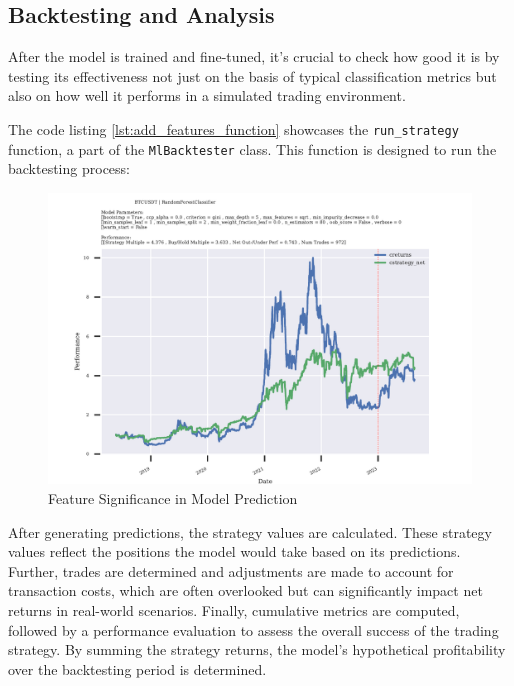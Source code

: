\subsection{Backtesting and Analysis}
After the model is trained and fine-tuned, it's crucial to check how good it is by testing its effectiveness not just on the basis of typical classification metrics but also on how well it performs in a simulated trading environment.

The code listing \ref{lst:add_features_function} showcases the \texttt{run\_strategy} function, a part of the \texttt{MlBacktester} class. This function is designed to run the backtesting process:

\begin{figure}[h]
\centering
\begin{adjustbox}{max width=1.3\textwidth,center}
\includegraphics[scale=1.3]{./pdf/report/backtest_res.pdf}
\end{adjustbox}
\caption{Feature Significance in Model Prediction}
\label{fig:backtest_res}
\end{figure}

After generating predictions, the strategy values are calculated. These strategy values reflect the positions the model would take based on its predictions.
Further, trades are determined and adjustments are made to account for transaction costs, which are often overlooked but can significantly impact net returns in real-world scenarios.
Finally, cumulative metrics are computed, followed by a performance evaluation to assess the overall success of the trading strategy.
By summing the strategy returns, the model's hypothetical profitability over the backtesting period is determined.

